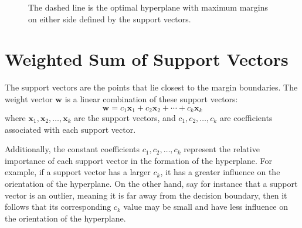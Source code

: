 \begin{figure}
    \centering
    \caption{The dashed line is the optimal hyperplane with maximum margins on either side defined by the support vectors.}
    \label{fig:maxmargin-svm}
\end{figure}

\section{Weighted Sum of Support Vectors}

The support vectors are the points that lie closest to the margin boundaries. The weight vector \( \mathbf{w} \) is a linear combination of these support vectors:
\[
\mathbf{w} = c_1 \mathbf{x}_1 + c_2 \mathbf{x}_2 + \cdots + c_k \mathbf{x}_k
\]
where \( \mathbf{x}_1, \mathbf{x}_2, \dots, \mathbf{x}_k \) are the support vectors, and \( c_1, c_2, \dots, c_k \) are coefficients associated with each support vector. 

Additionally, the constant coefficients \( c_1, c_2, \dots, c_k \) represent the relative importance of each support vector in the formation of the hyperplane. 
For example, if a support vector has a larger \( c_k \), it has a greater influence on the orientation of the hyperplane. On the other hand, say for instance that a support vector is an outlier, 
meaning it is far away from the decision boundary, then it follows that its corresponding \( c_k \) value may be small and have less influence on the orientation of the hyperplane.

